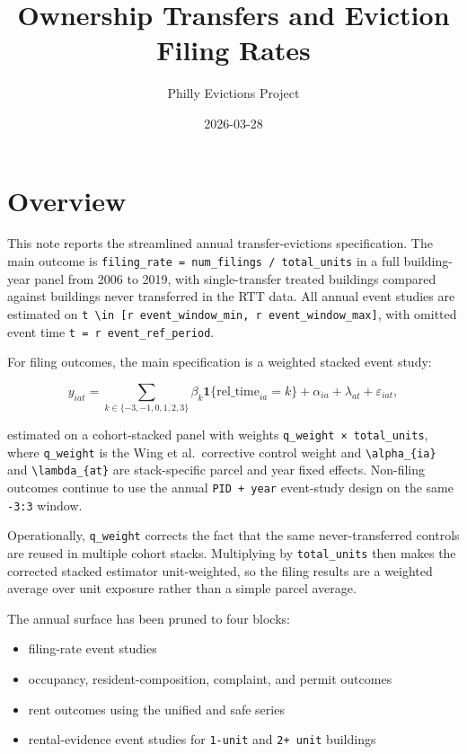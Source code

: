 \documentclass[
  11pt,
]{article}
\title{Ownership Transfers and Eviction Filing Rates}
\author{Philly Evictions Project}
\date{2026-03-28}
\providecommand{\tightlist}{%
  \setlength{\itemsep}{0pt}\setlength{\parskip}{0pt}}
\renewcommand*\contentsname{Table of contents}
\newcommand\contentsname{Table of contents}
\begin{document}
\maketitle

\renewcommand*\contentsname{Table of contents}
{
\hypersetup{linkcolor=}
\setcounter{tocdepth}{3}
\tableofcontents
}

\section{Overview}\label{overview}

This note reports the streamlined annual transfer-evictions
specification. The main outcome is
\texttt{filing\_rate\ =\ num\_filings\ /\ total\_units} in a full
building-year panel from 2006 to 2019, with single-transfer treated
buildings compared against buildings never transferred in the RTT data.
All annual event studies are estimated on
\texttt{t\ \textbackslash{}in\ {[}r\ event\_window\_min,\ r\ event\_window\_max{]}},
with omitted event time \texttt{t\ =\ r\ event\_ref\_period}.

For filing outcomes, the main specification is a weighted stacked event
study:

\[
y_{i a t} = \sum_{k \in \{-3,-1,0,1,2,3\}} \beta_k \mathbf{1}\{\mathrm{rel\_time}_{ia}=k\}
          + \alpha_{ia} + \lambda_{at} + \varepsilon_{iat},
\]

estimated on a cohort-stacked panel with weights
\texttt{q\_weight\ ×\ total\_units}, where \texttt{q\_weight} is the
Wing et al.~corrective control weight and
\texttt{\textbackslash{}alpha\_\{ia\}} and
\texttt{\textbackslash{}lambda\_\{at\}} are stack-specific parcel and
year fixed effects. Non-filing outcomes continue to use the annual
\texttt{PID\ +\ year} event-study design on the same \texttt{-3:3}
window.

Operationally, \texttt{q\_weight} corrects the fact that the same
never-transferred controls are reused in multiple cohort stacks.
Multiplying by \texttt{total\_units} then makes the corrected stacked
estimator unit-weighted, so the filing results are a weighted average
over unit exposure rather than a simple parcel average.

The annual surface has been pruned to four blocks:

\begin{itemize}
\tightlist
\item
  filing-rate event studies
\item
  occupancy, resident-composition, complaint, and permit outcomes
\item
  rent outcomes using the unified and safe series
\item
  rental-evidence event studies for \texttt{1-unit} and
  \texttt{2+\ unit} buildings
\end{itemize}
\end{document}
